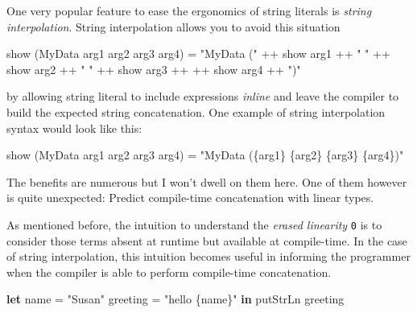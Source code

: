 \documentclass[
]{article}
\newenvironment{Shaded}{}{}
\newcommand{\DataTypeTok}[1]{\textcolor[rgb]{0.56,0.13,0.00}{#1}}
\newcommand{\FunctionTok}[1]{\textcolor[rgb]{0.02,0.16,0.49}{#1}}
\newcommand{\KeywordTok}[1]{\textcolor[rgb]{0.00,0.44,0.13}{\textbf{#1}}}
\newcommand{\NormalTok}[1]{#1}
\newcommand{\OperatorTok}[1]{\textcolor[rgb]{0.40,0.40,0.40}{#1}}
\newcommand{\OtherTok}[1]{\textcolor[rgb]{0.00,0.44,0.13}{#1}}
\newcommand{\StringTok}[1]{\textcolor[rgb]{0.25,0.44,0.63}{#1}}
\begin{document}
One very popular feature to ease the ergonomics of string literals is
\emph{string interpolation}. String interpolation allows you to avoid
this situation

\begin{Shaded}
\begin{Highlighting}[]
\FunctionTok{show}\NormalTok{ (}\DataTypeTok{MyData}\NormalTok{ arg1 arg2 arg3 arg4) }\OtherTok{=} \StringTok{"MyData ("} \OperatorTok{++} \FunctionTok{show}\NormalTok{ arg1 }\OperatorTok{++} \StringTok{" "} \OperatorTok{++} \FunctionTok{show}\NormalTok{ arg2 }\OperatorTok{++} \StringTok{" "} \OperatorTok{++} \FunctionTok{show}\NormalTok{ arg3 }\OperatorTok{++} \OperatorTok{++} \FunctionTok{show}\NormalTok{ arg4 }\OperatorTok{++} \StringTok{")"}
\end{Highlighting}
\end{Shaded}

by allowing string literal to include expressions \emph{inline} and
leave the compiler to build the expected string concatenation. One
example of string interpolation syntax would look like this:

\begin{Shaded}
\begin{Highlighting}[]
\FunctionTok{show}\NormalTok{ (}\DataTypeTok{MyData}\NormalTok{ arg1 arg2 arg3 arg4) }\OtherTok{=} \StringTok{"MyData (\{arg1\} \{arg2\} \{arg3\} \{arg4\})"}
\end{Highlighting}
\end{Shaded}

The benefits are numerous but I won't dwell on them here. One of them
however is quite unexpected: Predict compile-time concatenation with
linear types.

As mentioned before, the intuition to understand the \emph{erased
linearity} \texttt{0} is to consider those terms absent at runtime but
available at compile-time. In the case of string interpolation, this
intuition becomes useful in informing the programmer when the compiler
is able to perform compile-time concatenation.

\begin{Shaded}
\begin{Highlighting}[]
\KeywordTok{let}\NormalTok{ name }\OtherTok{=} \StringTok{"Susan"}
\NormalTok{    greeting }\OtherTok{=} \StringTok{"hello \{name\}"} \KeywordTok{in}
    \FunctionTok{putStrLn}\NormalTok{ greeting}
\end{Highlighting}
\end{Shaded}
\end{document}
